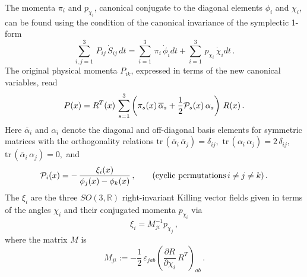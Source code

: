 \documentclass[a4paper,12pt]{article}
\newcommand{\sot}{SO(3, \mathbb{R})}
\begin{document}
The momenta $\pi_i$ and $p_{\chi_i}$, canonical conjugate
to the diagonal elements $\phi_i$ and  $\chi_i$, can be found using
the condition of the canonical invariance of the symplectic 1-form
\begin{equation}
\sum^3_{i,j = 1}\, P_{ij}\, \dot{S}_{ij}\, dt  =
\sum^3_{i = 1}\, \pi_{i}\, \dot{\phi}_{i} dt  +
\sum^3_{i = 1}\, p_{\chi_i}\, \dot{\chi}_i  dt\,.
\end{equation}
The original physical momenta $P_{ik}$, expressed
in terms of the new canonical variables, read
\begin{eqnarray} \label{eq:newmom}
P(x) =
R^T(x)\,
\sum_{s = 1}^3\left(
\pi_s(x) \, \overline{\alpha}_s + \frac{1}{2}{\cal P}_s(x) \,\alpha_s
\right)\,
R(x)\,.
\end{eqnarray}
Here $\overline{\alpha}_i$ and $\alpha_i$
denote the diagonal and off-diagonal basis elements for symmetric matrices
with the orthogonality relations
$\mbox{tr}\, (\overline{\alpha}_i \, \overline{\alpha}_j) = \delta_{ij},$
$\mbox{tr}\, ({\alpha}_i \, {\alpha}_j) = 2\, \delta_{ij},$
$\mbox{tr}\, (\overline{\alpha}_i \, {\alpha}_j) = 0,$
and
\begin{equation}
\label{P+approx}
{\cal P}_i (x) = - \, \frac{\xi_i(x)}{\phi_j(x) - \phi_k(x)}\,,
\qquad
(\mbox{cyclic permutations} \, i\not=j\not= k )\,.
\end{equation}
The $\xi_i$ are the three $\sot$ right-invariant Killing vector fields
given in terms of the angles $\chi_i$ and their conjugated momenta
$p_{\chi_i}$ via
\begin{equation}
\xi_i = M^{-1}_{ji} p_{\chi_j}\,,
\end{equation}
where the matrix $M$ is
\begin{equation} \label{eq:MCr}
M_{ji} := - \frac{1}{2}\, \varepsilon_{jab}
\left(\frac{\partial R}{\partial \chi_i}\, R^T\right)_{ab}\,.
\end{equation}
\end{document}
